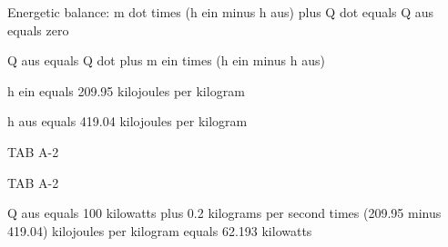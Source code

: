 Energetic balance: m dot times (h ein minus h aus) plus Q dot equals Q aus equals zero

Q aus equals Q dot plus m ein times (h ein minus h aus)

h ein equals 209.95 kilojoules per kilogram

h aus equals 419.04 kilojoules per kilogram

TAB A-2

TAB A-2

Q aus equals 100 kilowatts plus 0.2 kilograms per second times (209.95 minus 419.04) kilojoules per kilogram equals 62.193 kilowatts